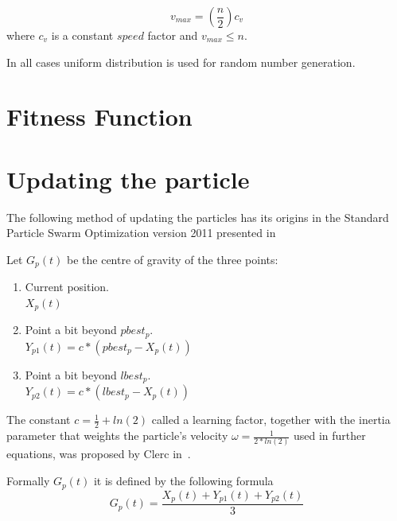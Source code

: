 \documentclass{mini}
\begin{document}
\begin{equation}
    v_{max} = (\frac{n}{2})c_{v}
\end{equation}
where $c_{v}$ is a constant $speed$ factor and $v_{max} \leq n$.

In all cases uniform distribution is used for random number generation.

\section{Fitness Function}\label{sec:fitness}

\section{Updating the particle}


The following method of updating the particles has its origins in the Standard Particle Swarm Optimization version 2011 presented in~\cite{pso_11}

Let $G_p(t)$ be the centre of gravity of the three points:
\begin{enumerate}
    \item Current position. \\
    $X_p(t)$
    
    \item Point a bit beyond $pbest_p$. \\
    $Y_{p1}(t) = c*(pbest_p-X_p(t))$
    
    \item Point a bit beyond $lbest_p$. \\
    $Y_{p2}(t) = c*(lbest_p-X_p(t))$
    
\end{enumerate}

The constant $c = \frac{1}{2} + ln(2)$ called a learning factor, together with the inertia parameter that weights the particle's velocity $\omega = \frac{1}{2 * ln(2)}$ used in further equations, was proposed by Clerc in~\cite{pso_anal}.

Formally $G_p(t)$ it is defined by the following formula 
\begin{equation}
    G_p(t) = \frac{X_p(t) + Y_{p1}(t) + Y_{p2}(t)} {3}
\end{equation}
\end{document}
